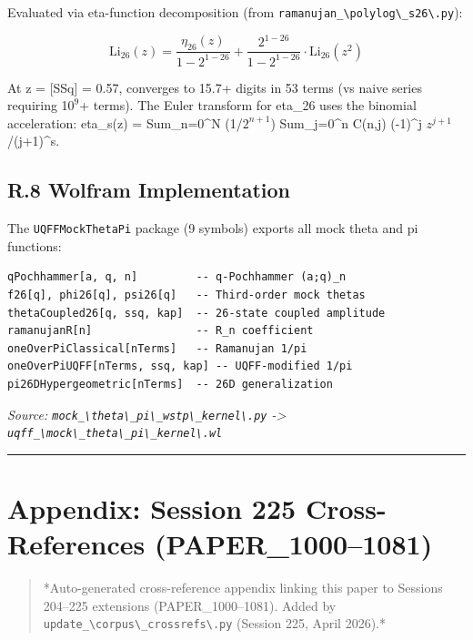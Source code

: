 \documentclass[12pt,a4paper]{article}
\begin{document}
Evaluated via eta-function decomposition (from \texttt{ramanujan\_\textbackslash {polylog\textbackslash \_s26\textbackslash }.py}):

\begin{equation}
\text{Li}_{26}(z) = \frac{\eta_{26}(z)}{1 - 2^{1-26}} + \frac{2^{1-26}}{1 - 2^{1-26}} \cdot \text{Li}_{26}(z^2)
\end{equation}

At z = [SSq] = 0.57, converges to 15.7+ digits in 53 terms (vs naive series requiring 1$0^{9}$+ terms). The Euler transform for eta\_26 uses the binomial acceleration: eta\_s(z) = Sum\_{n=0}\^{}{N} (1/$2^{n+1}$) Sum\_{j=0}\^{}{n} C(n,j) (-1)\^{}j $z^{j+1}$/(j+1)\^{}s.

\subsection{R.8 Wolfram Implementation}

The \texttt{UQFFMockThetaPi} package (9 symbols) exports all mock theta and pi functions:

\begin{verbatim}
qPochhammer[a, q, n]         -- q-Pochhammer (a;q)_n
f26[q], phi26[q], psi26[q]   -- Third-order mock thetas
thetaCoupled26[q, ssq, kap]  -- 26-state coupled amplitude
ramanujanR[n]                -- R_n coefficient
oneOverPiClassical[nTerms]   -- Ramanujan 1/pi
oneOverPiUQFF[nTerms, ssq, kap] -- UQFF-modified 1/pi
pi26DHypergeometric[nTerms]  -- 26D generalization
\end{verbatim}

\emph{Source: \texttt{mock\_\textbackslash {theta\textbackslash \_pi\textbackslash \_wstp\textbackslash \_kernel\textbackslash }.py} -> \texttt{uqff\_\textbackslash {mock\textbackslash \_theta\textbackslash \_pi\textbackslash \_kernel\textbackslash }.wl}}

\medskip\hrule\medskip

\section{Appendix: Session 225 Cross-References (PAPER\_1000--1081)}

\begin{quote}
*Auto-generated cross-reference appendix linking this paper to
Sessions 204--225 extensions (PAPER\_1000--1081). Added by
\texttt{update\_\textbackslash {corpus\textbackslash \_crossrefs\textbackslash }.py} (Session 225, April 2026).*
\end{quote}
\end{document}
